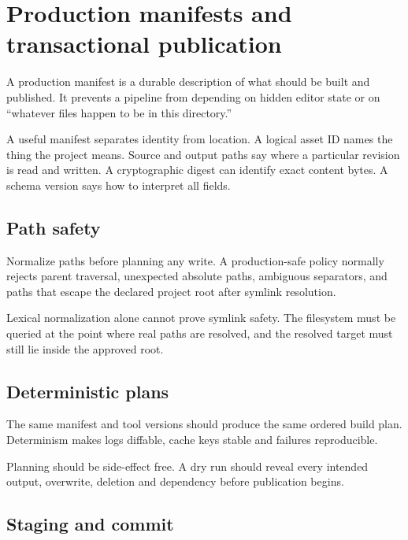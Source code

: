 \hypertarget{appendix-91eaa3cbdbc3}{}
\section{Production manifests and transactional publication}\label{appendix-91eaa3cbdbc3-production-manifests-and-transactional-publication}

A production manifest is a durable description of what should be built and published. It prevents a pipeline from depending on hidden editor state or on ``whatever files happen to be in this directory.''

A useful manifest separates identity from location. A logical asset ID names the thing the project means. Source and output paths say where a particular revision is read and written. A cryptographic digest can identify exact content bytes. A schema version says how to interpret all fields.

\subsection{Path safety}\label{appendix-91eaa3cbdbc3-path-safety}

Normalize paths before planning any write. A production-safe policy normally rejects parent traversal, unexpected absolute paths, ambiguous separators, and paths that escape the declared project root after symlink resolution.

Lexical normalization alone cannot prove symlink safety. The filesystem must be queried at the point where real paths are resolved, and the resolved target must still lie inside the approved root.

\subsection{Deterministic plans}\label{appendix-91eaa3cbdbc3-deterministic-plans}

The same manifest and tool versions should produce the same ordered build plan. Determinism makes logs diffable, cache keys stable and failures reproducible.

Planning should be side-effect free. A dry run should reveal every intended output, overwrite, deletion and dependency before publication begins.

\subsection{Staging and commit}\label{appendix-91eaa3cbdbc3-staging-and-commit}

